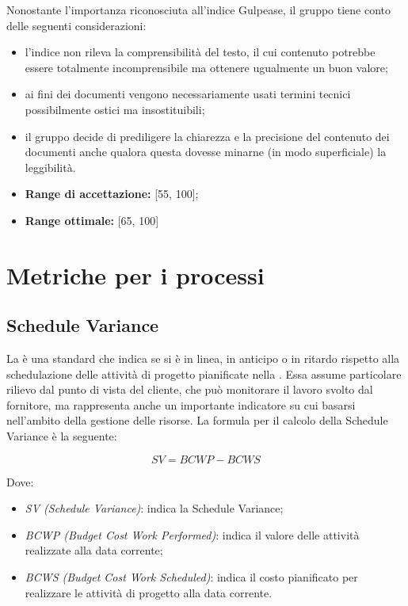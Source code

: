 \documentclass[openany,12pt,a4paper]{report}
\begin{document}
Nonostante l'importanza riconosciuta all'indice Gulpease, il gruppo tiene conto delle seguenti considerazioni:
\begin{itemize}
    \item l'indice non rileva la comprensibilità del testo, il cui contenuto potrebbe essere totalmente incomprensibile ma ottenere ugualmente un buon valore; 
    \item ai fini dei documenti vengono necessariamente usati termini tecnici possibilmente ostici ma insostituibili;
    \item il gruppo decide di prediligere la chiarezza e la precisione del contenuto dei documenti anche qualora questa dovesse minarne (in modo superficiale) la leggibilità.
\end{itemize}

\begin{itemize}
    \item \textbf{Range di accettazione:} [55, 100];
    
    \item \textbf{Range ottimale:} [65, 100]
\end{itemize}


\section{Metriche per i processi}

\subsection{Schedule Variance}

La  è una  standard che indica se si è in linea, in anticipo o in ritardo rispetto alla schedulazione delle attività di progetto pianificate nella . Essa assume particolare rilievo dal punto di vista del cliente, che può monitorare il lavoro svolto dal fornitore, ma rappresenta anche un importante indicatore su cui basarsi nell'ambito della gestione delle risorse. La formula per il calcolo della Schedule Variance è la seguente:

\[ SV = BCWP - BCWS \]

Dove:

\begin{itemize}
    \item \textit{SV (Schedule Variance)}: indica la Schedule Variance;
    \item \textit{BCWP (Budget Cost Work Performed)}: indica il valore delle attività realizzate alla data corrente;
    \item \textit{BCWS (Budget Cost Work Scheduled)}: indica il costo pianificato per realizzare le attività di progetto alla data corrente.
\end{itemize}
\end{document}
